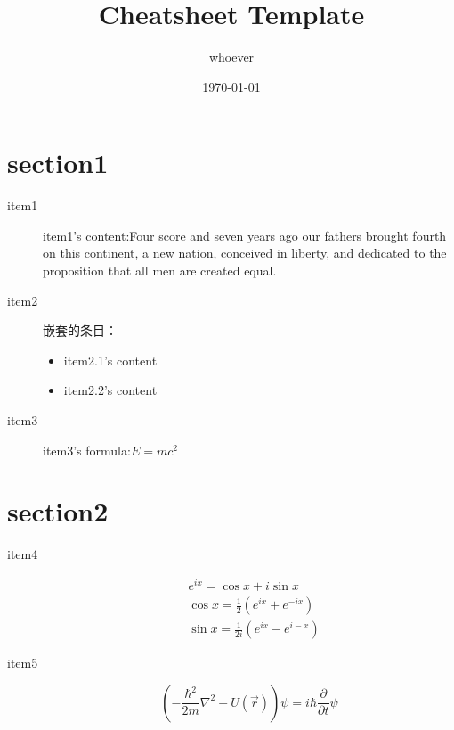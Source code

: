 \documentclass[red, cn, 8pt, cheatsheet]{elegantnote}
\title{Cheatsheet Template}
\author{whoever}
\date{\today}
\begin{document}
\begin{multicols*}{4}       %
\section{section1}          %
\begin{description}
    \item[item1]{item1's content:Four score and seven years ago our fathers brought fourth on this continent, a new nation, conceived in liberty, and dedicated to the proposition that all men are created equal.}       %
    \item[item2]                        %
    嵌套的条目：
        \begin{itemize}
            \item item2.1's content
            \item item2.2's content
        \end{itemize}
    \item[item3]{item3's formula:$E=mc^2$}  %

\end{description}

\section{section2}
\begin{description}
    \item[item4]
    \begin{equation*}           %
        \begin{aligned}
            &e^{ix} = \cos x + i\sin x\\
            &\cos x = \frac{1}{2}(e^{ix}+e^{-ix})\\
            &\sin x = \frac{1}{2i}(e^{ix}-e^{i-x})
        \end{aligned}
    \end{equation*}
    \item[item5]
    \begin{equation*}
        \left(-\frac{\hbar^2}{2m}\nabla^2+U(\vec r)\right)\psi = i\hbar\frac{\partial}{\partial t}\psi
    \end{equation*}

\end{description}



\end{multicols*}
\end{document}
